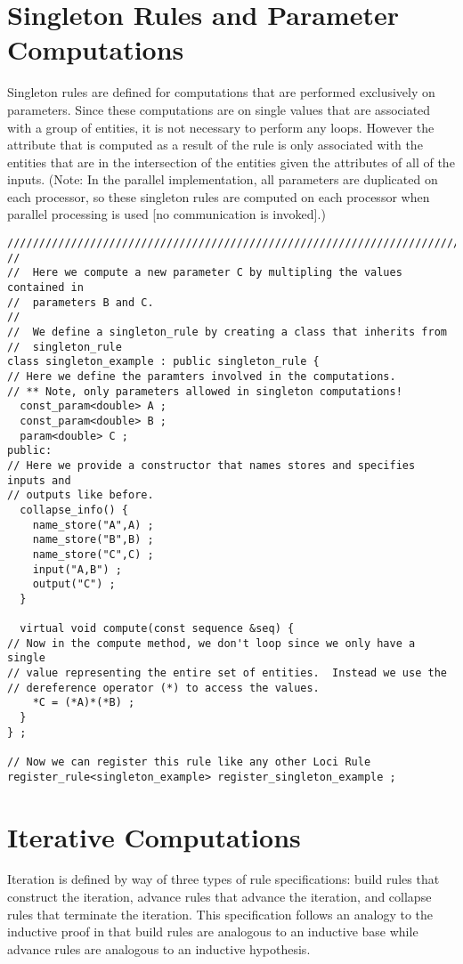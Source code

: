 \documentclass[10pt,epsf]{book}
\begin{document}
\section{Singleton Rules and Parameter Computations}

Singleton rules are defined for computations that are performed
exclusively on parameters.  Since these computations are on single
values that are associated with a group of entities, it is not
necessary to perform any loops.  However the attribute that is
computed as a result of the rule is only associated with the entities
that are in the intersection of the entities given the attributes of
all of the inputs.  (Note:  In the parallel implementation, all
parameters are duplicated on each processor, so these singleton rules
are computed on each processor when parallel processing is used [no
communication is invoked].)

\begin{verbatim}
///////////////////////////////////////////////////////////////////////////////
//
//  Here we compute a new parameter C by multipling the values contained in
//  parameters B and C.
//  
//  We define a singleton_rule by creating a class that inherits from 
//  singleton_rule
class singleton_example : public singleton_rule {
// Here we define the paramters involved in the computations.
// ** Note, only parameters allowed in singleton computations!
  const_param<double> A ;
  const_param<double> B ;
  param<double> C ;
public:
// Here we provide a constructor that names stores and specifies inputs and
// outputs like before.
  collapse_info() {
    name_store("A",A) ;
    name_store("B",B) ;
    name_store("C",C) ;
    input("A,B") ;
    output("C") ;
  }

  virtual void compute(const sequence &seq) {
// Now in the compute method, we don't loop since we only have a single
// value representing the entire set of entities.  Instead we use the
// dereference operator (*) to access the values.
    *C = (*A)*(*B) ;
  }
} ;

// Now we can register this rule like any other Loci Rule
register_rule<singleton_example> register_singleton_example ;
\end{verbatim}

\section{Iterative Computations}


Iteration is defined by way of three types of rule specifications:
build rules that construct the iteration, advance rules that advance
the iteration, and collapse rules that terminate the iteration.  This
specification follows an analogy to the inductive proof in that build
rules are analogous to an inductive base while advance rules are
analogous to an inductive hypothesis.
\end{document}
